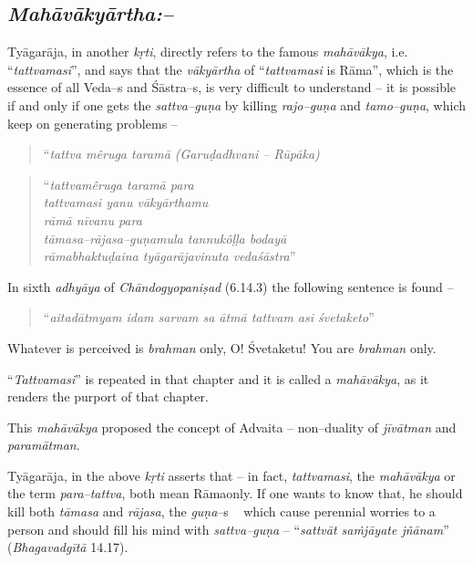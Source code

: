 \subsection*{\textit{Mahāvākyārtha:–}}

Tyāgarāja, in another \textit{kṛti}, directly refers to the famous \textit{mahāvākya}, i.e. “\textit{tattvamasi}”, and says that the \textit{vākyārtha} of “\textit{tattvamasi} is Rāma”, which is the essence of all Veda–s and Śāstra–s, is very difficult to understand – it is possible if and only if one gets the \textit{sattva–guṇa} by killing \textit{rajo–guṇa} and \textit{tamo–guṇa}, which keep on generating problems –

\begin{verse}
“\textit{tattva mêruga taramā (Garuḍadhvani – Rūpāka)}
\end{verse}

\begin{verse}
“\textit{tattvamêruga taramā para}\\\textit{tattvamasi yanu vākyārthamu}\\\textit{rāmā nīvanu para}\\\textit{tāmasa–rājasa–guṇamula tannukôḷḷa bodayā}\\\textit{rāmabhaktuḍaina tyāgarājavinuta vedaśāstra}”
\end{verse}

In sixth \textit{adhyāya} of \textit{Chāndogyopaniṣad} (6.14.3) the following sentence is found –

\begin{verse}
“\textit{aitadātmyam idam sarvam sa ātmā tattvam asi śvetaketo}”
\end{verse}

Whatever is perceived is \textit{brahman} only, O! Śvetaketu! You are \textit{brahman} only.

“\textit{Tattvamasi}” is repeated in that chapter and it is called a \textit{mahāvākya}, as it renders the purport of that chapter.

This \textit{mahāvākya} proposed the concept of Advaita – non–duality of \textit{jīvātman} and \textit{paramātman}.

Tyāgarāja, in the above \textit{kṛti} asserts that – in fact, \textit{tattvamasi}, the \textit{mahāvākya} or the term \textit{para–tattva}, both mean Rāmaonly. If one wants to know that, he should kill both \textit{tāmasa} and \textit{rājasa}, the \textit{guṇa}–s   which cause perennial worries to a person and should fill his mind with \textit{sattva–guṇa} – “\textit{sattvāt saṁjāyate jñānam}” (\textit{Bhagavadgītā} 14.17).


